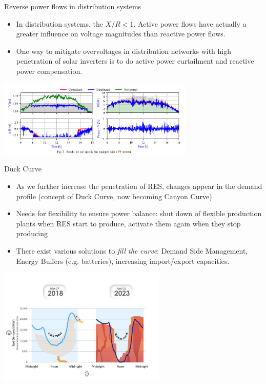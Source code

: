 \begin{frame}{Reverse power flows in distribution systems}
\begin{itemize}
    \item In distribution systems, the $X/R < 1$. Active power flows have actually a greater influence on voltage magnitudes than reactive power flows.
    \item One way to mitigate overvoltages in distribution networks with high penetration of solar inverters is to do active power curtailment and reactive power compensation.
\end{itemize}
\begin{center}
\includegraphics[width=0.7\textwidth]{images/VoltageCtrl.png}
\end{center}
\end{frame}

\begin{frame}[allowframebreaks]{Duck Curve}
\begin{itemize}
    \item As we further increase the penetration of RES, changes appear in the demand profile (concept of Duck Curve, now becoming Canyon Curve)
    \item Needs for flexibility to ensure power balance: shut down of flexible production plants when RES start to produce, activate them again when they stop producing
    \item There exist various solutions to \emph{fill the curve}: Demand Side Management, Energy Buffers (e.g. batteries), increasing import/export capacities.
\end{itemize}
\begin{center}
\includegraphics[width=0.6\textwidth]{images/duckcurve.png}
\end{center}
\end{frame}




